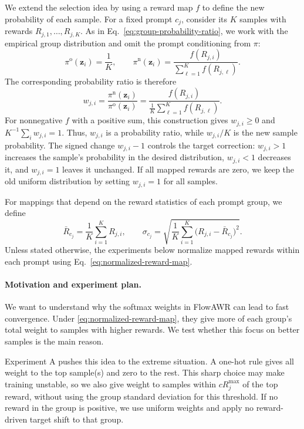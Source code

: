 \documentclass{article} %
\begin{document}
We extend the selection idea by using a reward map $f$ to define the new
probability of each sample. For a fixed prompt $c_j$, consider its $K$
samples with rewards $R_{j,1},\ldots,R_{j,K}$. As in
Eq.~\eqref{eq:group-probability-ratio}, we work with the empirical group
distribution and omit the prompt conditioning from $\pi$:
\begin{equation}
\pi^{\mathrm{o}}(\mathbf z_i)=\frac1K,
\qquad
\pi^{\mathrm{n}}(\mathbf z_i)
=\frac{f(R_{j,i})}{\sum_{\ell=1}^{K}f(R_{j,\ell})}.
\end{equation}
The corresponding probability ratio is therefore
\begin{equation}
w_{j,i}
=\frac{\pi^{\mathrm{n}}(\mathbf z_i)}{\pi^{\mathrm{o}}(\mathbf z_i)}
=\frac{f(R_{j,i})}{\frac1K\sum_{\ell=1}^{K}f(R_{j,\ell})}.
\label{eq:normalized-reward-map}
\end{equation}
For nonnegative $f$ with a positive sum, this construction gives
$w_{j,i}\ge0$ and $K^{-1}\sum_i w_{j,i}=1$. Thus, $w_{j,i}$ is a
probability ratio, while $w_{j,i}/K$ is the new sample probability.
The signed change $w_{j,i}-1$ controls the target correction:
$w_{j,i}>1$ increases the sample's probability in the desired distribution,
$w_{j,i}<1$ decreases it, and $w_{j,i}=1$ leaves it unchanged.
If all mapped rewards are zero, we keep the old uniform distribution
by setting $w_{j,i}=1$ for all samples.

For mappings that depend on the reward statistics of each prompt group,
we define
\[
\bar R_{c_j}=\frac1K\sum_{i=1}^{K}R_{j,i},
\qquad
\sigma_{c_j}=\sqrt{\frac1K\sum_{i=1}^{K}
\bigl(R_{j,i}-\bar R_{c_j}\bigr)^2}.
\]
Unless stated otherwise, the experiments below normalize mapped rewards
within each prompt using
Eq.~\eqref{eq:normalized-reward-map}.



\paragraph{Motivation and experiment plan.}
We want to understand why the softmax weights in FlowAWR can lead to fast
convergence. Under \eqref{eq:normalized-reward-map}, they give more of each group's total
weight to samples with higher rewards. We test whether this focus on better
samples is the main reason.

Experiment A pushes this idea to the extreme situation. A one-hot rule gives all weight to
the top sample(s) and zero to the rest. This sharp choice may make training
unstable, so we also give weight to samples within \(cR_j^{\max}\) of the top
reward, without using the group standard deviation for this threshold.
If no reward in the group is positive, we use uniform weights and apply no
reward-driven target shift to that group.
\end{document}
